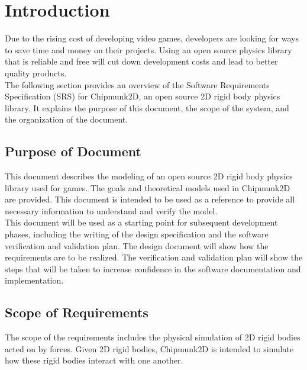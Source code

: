\documentclass[12pt]{article}
\begin{document}
%
%

\section{Introduction}

Due to the rising cost of developing video games, developers are looking for
ways to save time and money on their projects. Using an open source physics
library that is reliable and free will cut down development costs and lead 
to better quality products. \\
\newline
The following section provides an overview of the Software Requirements
Specification (SRS) for Chipmunk2D, an open source 2D rigid body physics library. It explains the purpose of this document,
the scope of the system, and the organization of the document.


\subsection{Purpose of Document}

This document describes the modeling of an open source
2D rigid body physics library used for games. The goals and theoretical
models used in Chipmunk2D are provided. This document is intended to be 
used as a reference to provide all necessary information to understand and verify
the model. \\
\newline
This document will be used as a starting point for subsequent development
phases, including the writing of the design specification and the software verification
and validation plan. The design document will show how the requirements are 
to be realized. The verification and validation plan will show the steps that will 
be taken to increase confidence in the software documentation and 
implementation.

\subsection{Scope of Requirements} 

The scope of the requirements includes the physical simulation of 2D rigid bodies 
acted on by forces. Given 2D rigid bodies, Chipmunk2D is intended to 
simulate how these rigid bodies interact with one another.
\end{document}
